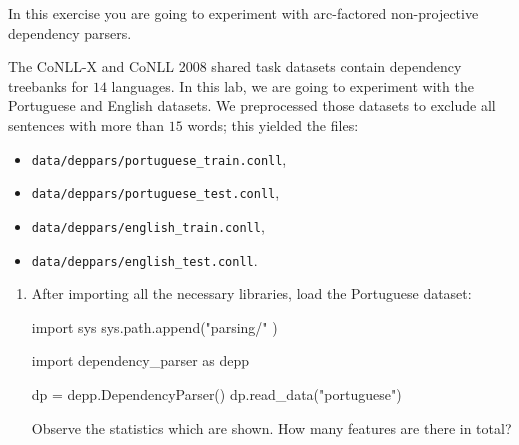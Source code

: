 \begin{exercise}
In this exercise you are going to experiment with arc-factored non-projective dependency parsers. 

The CoNLL-X and CoNLL 2008 shared task datasets \citep{conll06st,Surdeanu2008} contain 
dependency treebanks for $14$ languages. 
In this lab, we are going to experiment with the Portuguese and English datasets. 
We preprocessed those datasets to exclude all sentences with more than 
$15$ words; this yielded the files:
\begin{itemize}
\item {\tt data/deppars/portuguese\_train.conll},
\item {\tt data/deppars/portuguese\_test.conll},
\item {\tt data/deppars/english\_train.conll},
\item {\tt data/deppars/english\_test.conll}.
\end{itemize}

\begin{enumerate}
\item After importing all the necessary libraries, load the Portuguese dataset: 
\begin{python}
import sys
sys.path.append("parsing/" )

import dependency_parser as depp

dp = depp.DependencyParser()
dp.read_data("portuguese")
\end{python}
Observe the statistics which are shown. How many features are there in total?


\end{enumerate}
\end{exercise}
